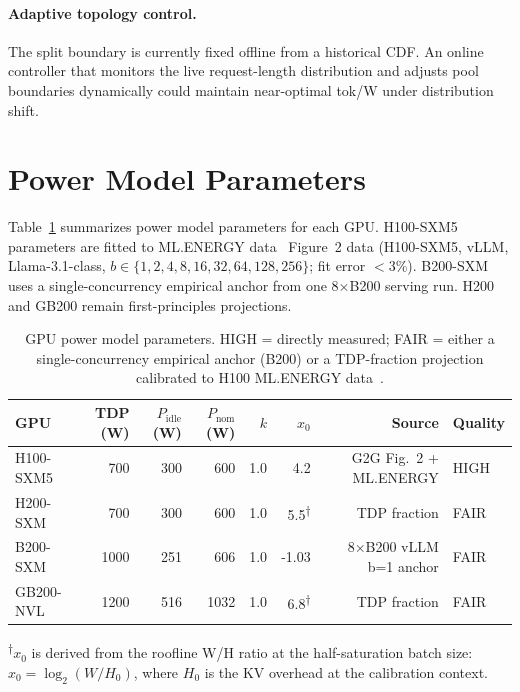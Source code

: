 \documentclass[11pt,a4paper]{article}
\newcommand{\Pidle}{P_{\text{idle}}}
\newcommand{\Pnom}{P_{\text{nom}}}
\begin{document}
\paragraph{Adaptive topology control.}
The split boundary is currently fixed offline from a historical CDF.  An
online controller that monitors the live request-length distribution and
adjusts pool boundaries dynamically could maintain near-optimal tok/W under
distribution shift.




\appendix

\section{Power Model Parameters}
\label{app:power}

Table~\ref{tab:power-params} summarizes power model parameters for each GPU.
H100-SXM5 parameters are fitted to ML.ENERGY data~\citep{chung2026mlenergy}
Figure~2 data (H100-SXM5, vLLM, Llama-3.1-class, $b \in \{1, 2, 4, 8, 16,
32, 64, 128, 256\}$; fit error $<$3\%).  B200-SXM uses a single-concurrency
empirical anchor from one 8$\times$B200 serving run.  H200 and GB200 remain
first-principles projections.

\begin{table}[htbp]
\centering
\caption{GPU power model parameters.  HIGH = directly measured; FAIR = either
  a single-concurrency empirical anchor (B200) or a TDP-fraction projection
  calibrated to H100 ML.ENERGY data~\citep{chung2026mlenergy}.}
\label{tab:power-params}
\small
\begin{tabular}{lrrrrrrl}
\toprule
GPU & TDP (W) & $\Pidle$ (W) & $\Pnom$ (W) & $k$ & $x_0$ & Source & Quality \\
\midrule
H100-SXM5 &  700 & 300 & 600 & 1.0 & 4.2 & G2G Fig.~2 + ML.ENERGY & HIGH \\
H200-SXM  &  700 & 300 & 600 & 1.0 & 5.5\textsuperscript{†} & TDP fraction & FAIR \\
B200-SXM  & 1000 & 251 & 606 & 1.0 & -1.03 & 8$\times$B200 vLLM b=1 anchor & FAIR \\
GB200-NVL & 1200 & 516 & 1032 & 1.0 & 6.8\textsuperscript{†} & TDP fraction & FAIR \\
\bottomrule
\end{tabular}

\medskip
\small\textsuperscript{†}$x_0$ is derived from the roofline W/H ratio
at the half-saturation batch size: $x_0 = \log_2(W/H_0)$, where $H_0$ is the
KV overhead at the calibration context.
\end{table}
\end{document}
